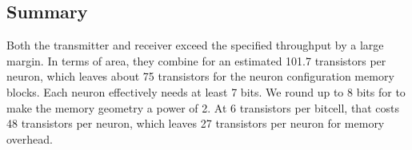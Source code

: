 \documentclass{article}
\begin{document}
\subsection{Summary}

Both the transmitter and receiver exceed the specified throughput by a large
margin.
In terms of area, they combine for an estimated 101.7 transistors per neuron,
which leaves about 75 transistors for the neuron configuration memory blocks.
Each neuron effectively needs at least 7 bits. We round up to 8 bits
for to make the memory geometry a power of 2. At 6 transistors per bitcell, that
costs 48 transistors per neuron, which leaves 27 transistors per neuron
for memory overhead.

\end{document}
